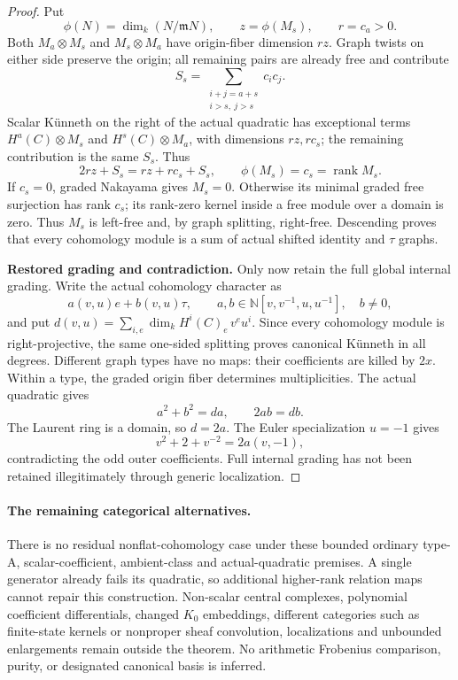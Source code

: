 \documentclass[11pt,a4paper]{article}
\theoremstyle{named}\newtheorem{finding}{Finding}[section]
\theoremstyle{definition}\newtheorem{definition}[finding]{Definition}
\theoremstyle{remark}\newtheorem{remark}[finding]{Remark}
\begin{document}
\begin{proof}
Put
\[
 \phi(N)=\dim_k(N/\mathfrak mN),\qquad
 z=\phi(M_s),\qquad r=c_a>0.
\]
Both \(M_a\otimes M_s\) and \(M_s\otimes M_a\)
have origin-fiber dimension \(rz\).
Graph twists on either side preserve the origin;
all remaining pairs are already free and contribute
\[
 S_s=\sum_{\substack{i+j=a+s\\i>s,\ j>s}}c_i c_j.
\]
Scalar K\"unneth on the right of the actual quadratic
has exceptional terms \(H^a(C)\otimes M_s\) and
\(H^s(C)\otimes M_a\), with dimensions \(rz,rc_s\);
the remaining contribution is the same \(S_s\).
Thus
\[
 2rz+S_s=rz+rc_s+S_s,\qquad
 \phi(M_s)=c_s=\operatorname{rank}M_s.
\]
If \(c_s=0\), graded Nakayama gives \(M_s=0\).
Otherwise its minimal graded free surjection has
rank \(c_s\); its rank-zero kernel inside a free
module over a domain is zero. Thus \(M_s\) is
left-free and, by graph splitting, right-free.
Descending proves that every cohomology module is
a sum of actual shifted identity and \(\tau\) graphs.

\par\smallskip\noindent\textbf{Restored grading and contradiction.}\quad
Only now retain the full global internal grading.
Write the actual cohomology character as
\[
 a(v,u)e+b(v,u)\tau,\qquad
 a,b\in\mathbb N[v,v^{-1},u,u^{-1}],\quad b\ne0,
\]
and put \(d(v,u)=\sum_{i,e}\dim_kH^i(C)_e\,v^eu^i\).
Since every cohomology module is right-projective,
the same one-sided splitting proves canonical
K\"unneth in all degrees. Different graph types
have no maps: their coefficients are killed by
\(2x\). Within a type, the graded origin fiber
determines multiplicities. The actual quadratic gives
\[
                         a^2+b^2=da,\qquad2ab=db.
\]
The Laurent ring is a domain, so \(d=2a\).
The Euler specialization \(u=-1\) gives
\[
                       v^2+2+v^{-2}=2a(v,-1),
\]
contradicting the odd outer coefficients.
Full internal grading has not been retained
illegitimately through generic localization.
\end{proof}

\paragraph{The remaining categorical alternatives.}
There is no residual nonflat-cohomology case under
these bounded ordinary type-A, scalar-coefficient,
ambient-class and actual-quadratic premises.
A single generator already fails its quadratic,
so additional higher-rank relation maps cannot
repair this construction.
Non-scalar central complexes, polynomial coefficient
differentials, changed \(K_0\) embeddings, different
categories such as finite-state kernels or nonproper
sheaf convolution, localizations and unbounded
enlargements remain outside the theorem.
No arithmetic Frobenius comparison, purity, or
designated canonical basis is inferred.
\end{document}
